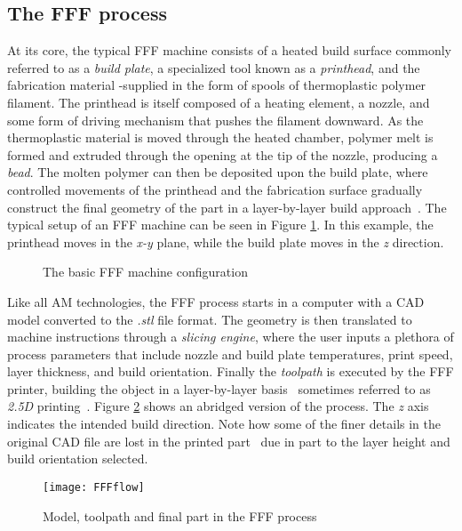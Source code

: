 \documentclass[main.tex]{subfiles}
\begin{document}
\subsection{The FFF process}\label{ssec:FFFmach}
At its core, the typical FFF machine consists of a heated build surface commonly referred to as a \emph{build plate}, a specialized tool known as a \emph{printhead}, and the fabrication material -supplied in the form of spools of thermoplastic polymer filament. The printhead is itself composed of a heating element, a nozzle, and some form of driving mechanism that pushes the filament downward. As the thermoplastic material is moved through the heated chamber, polymer melt is formed and extruded through the opening at the tip of the nozzle, producing a \emph{bead}. The molten polymer can then be deposited upon the build plate, where controlled movements of the printhead and the fabrication surface gradually construct the final geometry of the part in a layer-by-layer build approach~\cite{Gibson2015}. The typical setup of an FFF machine can be seen in Figure \ref{fig:machconfig}. In this example, the printhead moves in the \emph{x-y} plane, while the build plate moves in the \emph{z} direction. 
 
\begin{figure}[h]
	\center
	\hfill
	\caption{The basic FFF machine configuration} \label{fig:machconfig}
\end{figure}
Like all AM technologies, the FFF process starts in a computer with a CAD model converted to the \emph{.stl} file format. The geometry is then translated to machine instructions through a \emph{slicing engine}, where the user inputs a plethora of process parameters that include nozzle and build plate temperatures, print speed, layer thickness, and build orientation. Finally the \emph{toolpath} is executed by the FFF printer, building the object in a layer-by-layer basis \textendash~sometimes referred to as \emph{2.5D} printing~\cite{Gibson2015, VanHulle2017}. Figure \ref{fig:FFFflow} shows an abridged version of the process. The \emph{z} axis indicates the intended build direction. Note how some of the finer details in the original CAD file are lost in the printed part \textendash~due in part to the layer height and build orientation selected.

\pagebreak
\begin{figure}[h]
	\center
	\texttt{[image: FFFflow]}
	\caption{Model, toolpath and final part in the FFF process} \label{fig:FFFflow}
\end{figure}
\end{document}
